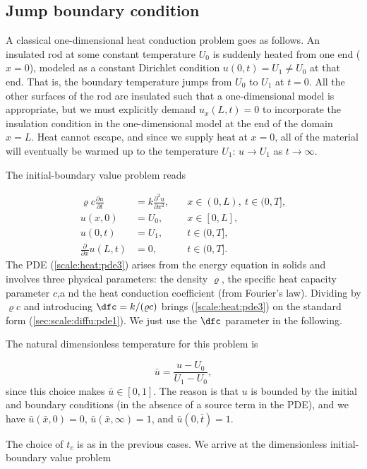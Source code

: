 \documentclass[graybox,envcountchap,sectrefs,final]{svmonodo}
\begin{document}
\subsection{Jump boundary condition}

A classical one-dimensional heat conduction problem goes as
follows. An insulated rod at some constant temperature $U_0$ is
suddenly heated from one end ($x=0$), modeled as a constant Dirichlet
condition $u(0,t)=U_1\neq U_0$ at that end. That is, the boundary
temperature jumps from $U_0$ to $U_1$ at $t=0$. All the other surfaces
of the rod are insulated such that a one-dimensional model is
appropriate, but we must explicitly demand $u_x(L,t)=0$ to incorporate
the insulation condition in the one-dimensional model at the end
of the domain $x=L$.  Heat cannot
escape, and since we supply heat at $x=0$, all of the material will
eventually be warmed up to the temperature $U_1$: $u\rightarrow U_1$
as $t\rightarrow\infty$.

The initial-boundary value problem reads

\begin{align}
\varrho c \frac{\partial u}{\partial t} &=
k \frac{\partial^2 u}{\partial x^2},
\quad &  x\in (0,L),\ t\in (0, T],
\label{scale:heat:pde3}\\ 
u(x,0) &= U_0,
\quad & x\in [0,L],
\label{scale:heat:pde3:ic:u}\\ 
u(0, t) & = U_1,
\quad  & t\in (0, T],
\label{scale:heat:pde3:bc:0}\\ 
\frac{\partial}{\partial x} u(L, t) & = 0,
\quad & t\in (0, T].
\label{scale:heat:pde3:bc:L}
\end{align}
The PDE (\ref{scale:heat:pde3}) arises from the energy equation in
solids and involves three physical parameters: the density $\varrho$,
the specific heat capacity parameter $c$,a nd the heat conduction
coefficient (from Fourier's law). Dividing by $\varrho c$ and
introducing $\dfc = k/(\varrho c)$ brings (\ref{scale:heat:pde3}) on
the standard form (\ref{sec:scale:diffu:pde1}). We just use the
$\dfc$ parameter in the following.

The natural dimensionless temperature for this problem is

\[ \bar u = \frac{u - U_0}{U_1 - U_0},\]
since this choice makes $\bar u\in [0,1]$. The reason is that $u$ is bounded by
the initial and boundary conditions (in the absence of a source term in
the PDE),
and we have
$\bar u(\bar x,0)=0$, $\bar u(\bar x,\infty)=1$, and $
\bar u(0,\bar t)=1$.

The choice of $t_c$ is as in the previous cases. We arrive at
the dimensionless initial-boundary value problem
\end{document}
